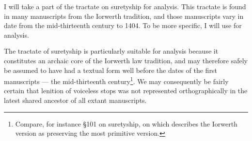 

I will take a part of the tractate on suretyship for analysis.
This tractate is found in many manuscripts from the Iorwerth tradition, and those manuscripts vary in date from the mid-thirteenth century to 1404.
To be more specific, I will use \textcite[\S\S58--65]{wiliam_llyfr_1960} for analysis.

The tractate of suretyship is particularly suitable for analysis because it constitutes an archaic core of the Iorwerth law tradition, and may therefore safely be assumed to have had a textual form well before the dates of the first manuscripts --- the mid-thirteenth century\footnote{Compare, for instance \S101 on suretyship, on which \textcite[20]{stacey_archaic_1986} describes the Iorwerth version as preserving the most primitive version.}. We may consequently be fairly certain that lenition of voiceless stops was not represented orthographically in the latest shared ancestor of all extant manuscripts.

